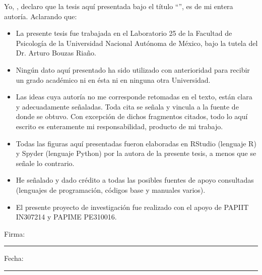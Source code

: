 \documentclass[
12pt, %
spanish, %
singlespacing, %
headsepline, %
]{Tesis_Lab25} %
\begin{document}
\begin{declaration}
\addchaptertocentry{\authorshipname} %
\noindent Yo, \authorname, declaro que la tesis aquí presentada bajo el título \enquote{\ttitle}, es de mi entera autoría. Aclarando que:\\

\begin{itemize} 
\item La presente tesis fue trabajada en el Laboratorio 25 de la Facultad de Psicología de la Universidad Nacional Autónoma de México, bajo la tutela del Dr. Arturo Bouzas Riaño. 
\item Ningún dato aquí presentado ha sido utilizado con anterioridad para recibir un grado académico ni en ésta ni en ninguna otra Universidad. 
\item Las ideas cuya autoría no me corresponde retomadas en el texto, están clara y adecuadamente señaladas. Toda cita se señala y vincula a la fuente de donde se obtuvo. Con excepción de dichos fragmentos citados, todo lo aquí escrito es enteramente mi responsabilidad, producto de mi trabajo. 
\item Todas las figuras aquí presentadas fueron elaboradas en RStudio (lenguaje R) y Spyder (lenguaje Python) por la autora de la presente tesis, a menos que se señale lo contrario.
\item He señalado y dado crédito a todas las posibles fuentes de apoyo consultadas (lenguajes de programación, códigos base y manuales varios).
\item El presente proyecto de investigación fue realizado con el apoyo de PAPIIT IN307214 y PAPIME PE310016.\\
\end{itemize}
 
\noindent Firma:\\
\rule[0.5em]{25em}{0.5pt} %
 
\noindent Fecha:\\
\rule[0.5em]{25em}{0.5pt} %
\end{declaration}

\cleardoublepage

\end{document}
